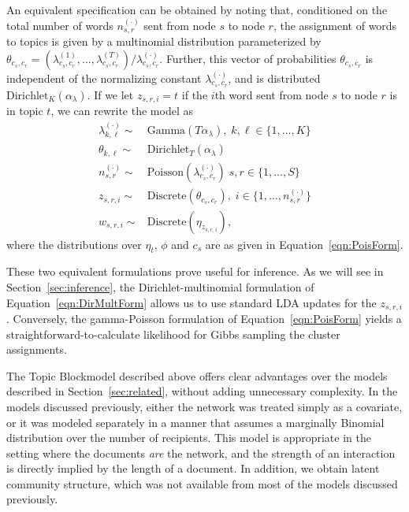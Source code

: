     An equivalent specification can be obtained by noting that, conditioned on the total number of words $n_{s,r}^{(\cdot)}$ sent from node $s$ to node $r$, the assignment of words to topics is given by a multinomial distribution parameterized by
    $ \theta_{c_s,c_r} = \left(\lambda_{c_s,c_r}^{(1)},\dots,  \lambda_{c_s,c_r}^{(T)}\right)/\lambda_{c_s,c_r}^{(\cdot)}$.
    Further, this vector of probabilities $\theta_{c_s,c_r}$ is independent of the normalizing constant $\lambda_{c_s,c_r}^{(\cdot)}$, and is distributed $\mbox{Dirichlet}_K(\alpha_\lambda)$. If we let $z_{s,r,i} =t$ if the $i$th word sent from node $s$ to node $r$ is in topic $t$, we can rewrite the model as
    \begin{equation}
      \begin{aligned}
        \lambda^{(\cdot)}_{k,\ell}\sim& \mbox{Gamma}(T\alpha_\lambda),\; k,\ell\in\{1,\dots, K\}\\
        \theta_{k,\ell} \sim& \mbox{Dirichlet}_T(\alpha_\lambda)\\
        n_{s,r}^{(\cdot)}\sim& \mbox{Poisson}(\lambda_{c_s,c_r}^{(\cdot)})\; s,r\in\{1,\dots, S\}\\
        z_{s,r,i} \sim& \mbox{Discrete}(\theta_{c_s,c_r}),\; i\in\{1,\dots, n_{s,r}^{(\cdot)}\}\\
        w_{s,r,i} \sim& \mbox{Discrete}(\eta_{z_{s,r,i}}),
      \end{aligned}\label{eqn:DirMultForm}
    \end{equation}
    where the distributions over $\eta_t$, $\phi$ and $c_s$ are as given in Equation~\ref{eqn:PoisForm}.
    
    These two equivalent formulations prove useful for inference. As we will see in Section~\ref{sec:inference}, the Dirichlet-multinomial formulation of Equation~\ref{eqn:DirMultForm} allows us to use standard LDA updates for the $z_{s,r,i}$. Conversely, the gamma-Poisson formulation of Equation~\ref{eqn:PoisForm} yields a straightforward-to-calculate likelihood for Gibbs sampling the cluster assignments. 
    
    The Topic Blockmodel described above offers clear advantages over the models described in Section~\ref{sec:related}, without adding unnecessary complexity. In the models discussed previously, either the network was treated simply as a covariate, or it was modeled separately in a manner that assumes a marginally Binomial distribution over the number of recipients. This model is appropriate in the setting where the documents \textit{are} the network, and the strength of an interaction is directly implied by the length of a document. In addition, we obtain latent community structure, which was not available from most of the models discussed previously.

